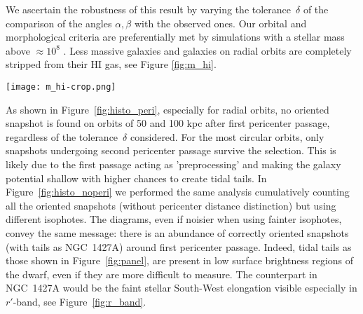 We ascertain the robustness of this result by varying the tolerance~$\delta$ of the comparison of the angles $\alpha, \beta$ with the observed ones.
Our orbital and morphological criteria are preferentially met by simulations with a stellar mass above $ \approx10^8 $ \Msun{}.
Less massive galaxies and galaxies on radial orbits are completely stripped from their HI gas, see Figure \ref{fig:m_hi}.
\begin{figure*}
\centering
\texttt{[image: m\_hi-crop.png]}
\caption{Neutral gas mass as a function of normalised time $\tau$ as defined in Figure \ref{fig:r_rps}.
Each panel is labelled with the simulation ID (cf. Table~\ref{tbl:sim}) and contains information for the simulated dwarf launched on orbits with different pericenter distances (50, 100, 150, 200, 300 kpc identified by the colour legend in the top-left panel). Gas is compressed when the isolated galaxy enters the cluster and as a consequence it cools down, thus increasing the neutral hydrogen mass. Obviously, around pericenter, ram pressure stripping is effective at driving down the gas mass (as shown also in Figure~\ref{fig:r_rps}).
}
\label{fig:m_hi}
\end{figure*}
As shown in Figure~\ref{fig:histo_peri}, especially for radial orbits, no oriented snapshot is found on orbits of 50 and 100 kpc after first pericenter passage, regardless of the tolerance~$\delta$ considered.
For the most circular orbits, only snapshots undergoing second pericenter passage survive the selection. This is likely due to the first passage acting as 'preprocessing' and making the galaxy potential shallow with higher chances to create tidal tails.
In Figure~\ref{fig:histo_noperi} we performed the same analysis cumulatively counting all the oriented snapshots (without pericenter distance distinction) but using different isophotes.
The diagrams, even if noisier when using fainter isophotes, convey the same message: there is an abundance of correctly oriented snapshots (with tails as NGC~1427A) around first pericenter passage.
Indeed, tidal tails as those shown in Figure~\ref{fig:panel}, are present in low surface brightness regions of the dwarf, even if they are more difficult to measure.
The counterpart in NGC~1427A would be the faint stellar South-West elongation visible especially in $r'$-band, see Figure~\ref{fig:r_band}.

